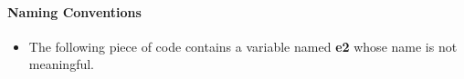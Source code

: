\paragraph{Naming Conventions}
\begin{itemize}
		\begin{itemize}
			\item
				The following piece of code contains a variable named \textbf{e2} whose name is not meaningful.
		\end{itemize}
\end{itemize}
%
